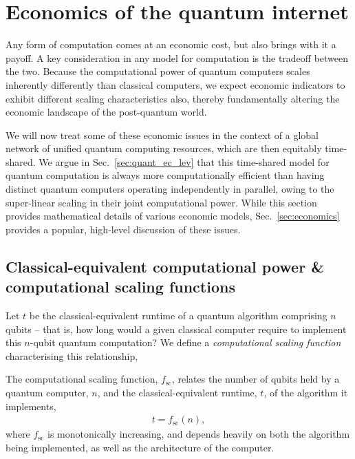 %
%

\section{Economics of the quantum internet} 

Any form of computation comes at an economic cost, but also brings with it a payoff. A key consideration in any model for computation is the tradeoff between the two. Because the computational power of quantum computers scales inherently differently than classical computers, we expect economic indicators to exhibit different scaling characteristics also, thereby fundamentally altering the economic landscape of the post-quantum world.

We will now treat some of these economic issues in the context of a global network of unified quantum computing resources, which are then equitably time-shared. We argue in Sec.~\ref{sec:quant_ec_lev} that this time-shared model for quantum computation is always more computationally efficient than having distinct quantum computers operating independently in parallel, owing to the super-linear scaling in their joint computational power. While this section provides mathematical details of various economic models, Sec.~\ref{sec:economics} provides a popular, high-level discussion of these issues.

%
%

\subsection{Classical-equivalent computational power \& computational scaling functions}

Let $t$ be the classical-equivalent runtime of a quantum algorithm comprising $n$ qubits -- that is, how long would a given classical computer require to implement this $n$-qubit quantum computation? We define a \textit{computational scaling function} characterising this relationship,

\begin{definition} \label{def:scaling_func} 
The computational scaling function, $f_\text{sc}$, relates the number of qubits held by a quantum computer, $n$, and the classical-equivalent runtime, $t$, of the algorithm it implements,
\begin{align}
t = f_\text{sc}(n),
\end{align}
	where $f_\text{sc}$ is monotonically increasing, and depends heavily on both the algorithm being implemented, as well as the architecture of the computer.
\end{definition}

